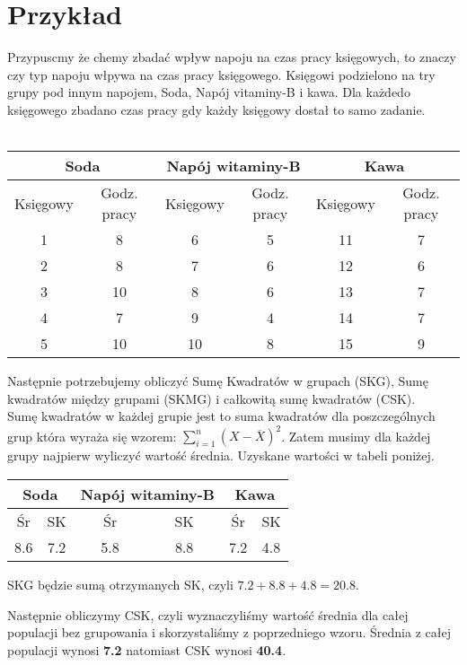 \documentclass{article}
\begin{document}
\section{Przykład}
Przypuscmy że chemy zbadać wpływ napoju na czas pracy księgowych, to znaczy czy typ napoju włpywa na czas pracy księgowego. Księgowi podzielono na try grupy pod innym napojem, Soda, Napój vitaminy-B i kawa. Dla każdedo księgowego zbadano czas pracy gdy każdy księgowy dostał to samo zadanie.\\
\\
\begin{tabular}{|c|c|c|c|c|c|}
\hline
\multicolumn{2}{|c|}{Soda} & \multicolumn{2}{|c|}{Napój witaminy-B} & \multicolumn{2}{|c|}{Kawa} \\
\hline
Księgowy & Godz. pracy & Księgowy & Godz. pracy & Księgowy & Godz. pracy\\
\hline
1 & 8 & 6 & 5 & 11 & 7 \\
\hline
2 & 8 & 7 & 6 & 12 & 6 \\
\hline
3 & 10 & 8 & 6 & 13 & 7 \\
\hline
4 & 7 & 9 & 4 & 14 & 7 \\
\hline
5 & 10 & 10 & 8 & 15 & 9 \\
\hline
\end{tabular}

Następnie potrzebujemy obliczyć Sumę Kwadratów w grupach (SKG), Sumę kwadratów między grupami (SKMG) i całkowitą sumę kwadratów (CSK).\\
Sumę kwadratów w każdej grupie jest to suma kwadratów dla poszczególnych grup która wyraża się wzorem: $\sum_{i=1}^n (X-\overline{X})^2$. Zatem musimy dla każdej grupy najpierw wyliczyć wartość średnia. Uzyskane wartości w tabeli poniżej. \\
\begin{center}
\begin{tabular}{|c|c|c|c|c|c|}
\hline
\multicolumn{2}{|c|}{Soda} & \multicolumn{2}{|c|}{Napój witaminy-B} & \multicolumn{2}{|c|}{Kawa} \\
\hline
Śr & SK & Śr & SK & Śr & SK \\
\hline
8.6 & 7.2 & 5.8 & 8.8 & 7.2 & 4.8\\
\hline
\end{tabular}
\end{center}
SKG będzie sumą otrzymanych SK, czyli $7.2 + 8.8 + 4.8 = 20.8$. \\ \par
Następnie obliczymy CSK, czyli wyznaczyliśmy wartość średnia dla całej populacji bez grupowania i skorzystaliśmy z poprzedniego wzoru. Średnia z całej populacji wynosi \textbf{7.2} natomiast CSK wynosi \textbf{40.4}. \\ \par
\end{document}

